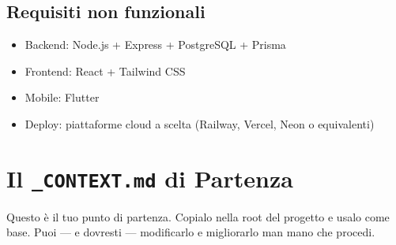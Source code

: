 \subsection{Requisiti non funzionali}

\begin{itemize}
  \item Backend: Node.js + Express + PostgreSQL + Prisma
  \item Frontend: React + Tailwind CSS
  \item Mobile: Flutter
  \item Deploy: piattaforme cloud a scelta (Railway, Vercel, Neon o equivalenti)
\end{itemize}

\section{Il \texttt{\_CONTEXT.md} di Partenza}

Questo è il tuo punto di partenza. Copialo nella root del progetto e usalo come base. Puoi --- e dovresti --- modificarlo e migliorarlo man mano che procedi.

